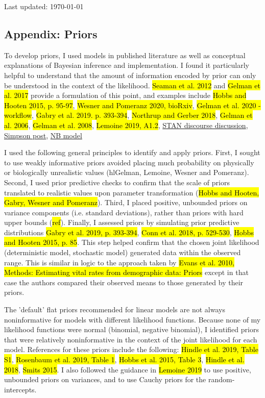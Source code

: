 \documentclass[12pt, oneside, titlepage]{article}   	%
\begin{document}
Last updated: \today

\subsection*{Appendix: Priors}

To develop priors, I used models in published literature as well as conceptual explanations of Bayesian inference and implementation. I found it particularly helpful to understand that the amount of information encoded by prior can only be understood in the context of the likelihood. \hl{Seaman et al. 2012} and \hl{Gelman et al. 2017} provide a formulation of this point, and examples include \hl{Hobbs and Hooten 2015, p. 95-97}, \hl{Wesner and Pomeranz 2020, bioRxiv}, \hl{Gelman et al. 2020 - workflow}, \hl{Gabry et al. 2019. p. 393-394}, \hl{Northrup and Gerber 2018}, \hl{Gelman et al. 2006}, \hl{Gelman et al. 2008}, \hl{Lemoine 2019, A1.2}, \href{https://discourse.mc-stan.org/t/choosing-weakly-informative-priors-for-population-level-effects-in-a-poisson-glmm/18008/5}{STAN discourse discussion}, \href{https://statmodeling.stat.columbia.edu/2018/09/12/against-arianism-2-arianism-grande/}{Simpson post}, \href{https://www.flutterbys.com.au/stats/tut/tut10.6b.html#h4_47}{NB model}

I used the following general principles to identify and apply priors. First, I sought to use weakly informative priors avoided placing much probability on physically or biologically unrealistic values (hl{Gelman, Lemoine, Wesner and Pomeranz}). Second, I used prior predictive checks to confirm that the scale of priors translated to realistic values upon parameter transformation (\hl{Hobbs and Hooten, Gabry, Wesner and Pomeranz}). Third, I placed positive, unbounded priors on variance components (i.e. standard deviations), rather than priors with hard upper bounds (\hl{ref}). Finally, I assessed priors by simulating prior predictive distributions \hl{Gabry et al. 2019, p. 393-394}, \hl{Conn et al. 2018, p. 529-530}, \hl{Hobbs and Hooten 2015, p. 85}. This step helped confirm that the chosen joint likelihood (deterministic model, stochastic model) generated data within the observed range. This is similar in logic to the approach taken by \hl{Evans et al. 2010, Methods: Estimating vital rates from demographic data: Priors} except in that case the authors compared their observed means to those generated by their priors.

The 'default' flat priors recommended for linear models are not always noninformative for models with different likelihood functions. Because none of my likelihood functions were normal (binomial, negative binomial), I identified priors that were relatively noninformative in the context of the joint likelihood for each model. References for these priors include the following: \hl{Hindle et al. 2019, Table S1}, \hl{Rosenbaum et al. 2019, Table 1}, \hl{Hobbs et al. 2015, Table 3}, \hl{Hindle et al. 2018}, \hl{Smits 2015}. I also followed the guidance in \hl{Lemoine 2019} to use positive, unbounded priors on variances, and to use Cauchy priors for the random-intercepts. 
\end{document}
